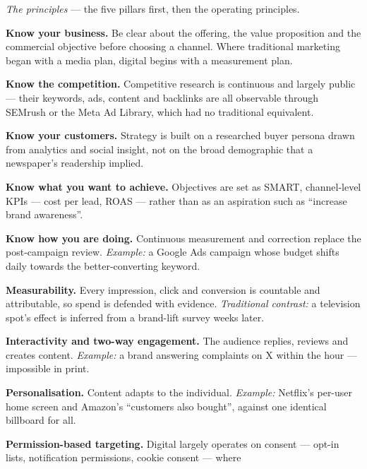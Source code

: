 \begin{qlist}
\textit{The principles} --- the five pillars first, then the operating
principles.
\begin{apts}
\item \textbf{Know your business.} Be clear about the offering, the value
      proposition and the commercial objective before choosing a channel. Where
      traditional marketing began with a media plan, digital begins with a
      measurement plan.
\item \textbf{Know the competition.} Competitive research is continuous and
      largely public --- their keywords, ads, content and backlinks are all
      observable through SEMrush or the Meta Ad Library, which had no
      traditional equivalent.
\item \textbf{Know your customers.} Strategy is built on a researched buyer
      persona drawn from analytics and social insight, not on the broad
      demographic that a newspaper's readership implied.
\item \textbf{Know what you want to achieve.} Objectives are set as SMART,
      channel-level KPIs --- cost per lead, ROAS --- rather than as an aspiration
      such as ``increase brand awareness''.
\item \textbf{Know how you are doing.} Continuous measurement and correction
      replace the post-campaign review. \emph{Example:} a Google Ads campaign
      whose budget shifts daily towards the better-converting keyword.
\item \textbf{Measurability.} Every impression, click and conversion is
      countable and attributable, so spend is defended with evidence.
      \emph{Traditional contrast:} a television spot's effect is inferred from
      a brand-lift survey weeks later.
\item \textbf{Interactivity and two-way engagement.} The audience replies,
      reviews and creates content. \emph{Example:} a brand answering complaints
      on X within the hour --- impossible in print.
\item \textbf{Personalisation.} Content adapts to the individual.
      \emph{Example:} Netflix's per-user home screen and Amazon's ``customers
      also bought'', against one identical billboard for all.
\item \textbf{Permission-based targeting.} Digital largely operates on consent
      --- opt-in lists, notification permissions, cookie consent --- where

\end{apts}
\end{qlist}
